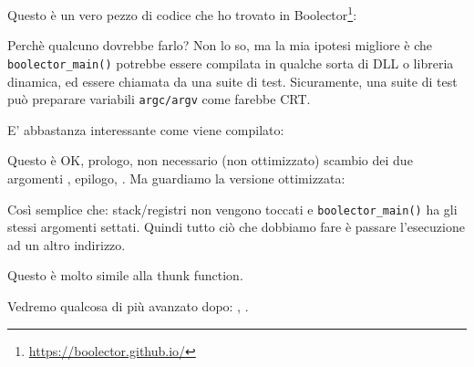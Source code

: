 \label{Boolector}

Questo è un vero pezzo di codice che ho trovato in  Boolector\footnote{\url{https://boolector.github.io/}}:



Perchè qualcuno dovrebbe farlo?
Non lo so, ma la mia ipotesi migliore è che \verb|boolector_main()| potrebbe essere compilata in qualche sorta di DLL o libreria dinamica,
ed essere chiamata da una suite di test.
Sicuramente, una suite di test può preparare variabili \verb|argc/argv| come farebbe \ac{CRT}.

E' abbastanza interessante come viene compilato:



Questo è OK, prologo, non necessario (non ottimizzato) scambio dei due argomenti , epilogo, .
Ma guardiamo la versione ottimizzata:



Così semplice che: stack/registri non vengono toccati e \verb|boolector_main()| ha gli stessi argomenti settati.
Quindi tutto ciò che dobbiamo fare è passare l'esecuzione ad un altro indirizzo.

Questo è molto simile alla \gls{thunk function}.

Vedremo qualcosa di più avanzato dopo: , .

